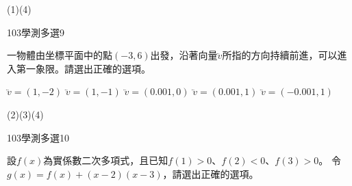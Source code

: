 \begin{QUESTIONS}
\begin{QUESTION}
        \begin{QANS}
            (1)(4)
        \end{QANS}
        \begin{QSOLLIST}
        \end{QSOLLIST}
        \begin{QEMPTYSPACE}
        \end{QEMPTYSPACE}
    \end{QUESTION}
    \begin{QUESTION}
        \begin{ExamInfo}{103}{學測}{多選}{9}
        \end{ExamInfo}
        \begin{ExamAnsRateInfo}{71}{94}{77}{42}
        \end{ExamAnsRateInfo}
        \begin{QBODY}
			一物體由坐標平面中的點$(-3,6)$出發，沿著向量$\lvec{v}$所指的方向持續前進，可以進入第一象限。請選出正確的選項。
			\begin{QOPS}
				\QOP $\lvec{v}=(1,-2)$
				\QOP $\lvec{v}=(1,-1)$
				\QOP $\lvec{v}=(0.001,0)$
				\QOP $\lvec{v}=(0.001,1)$
				\QOP $\lvec{v}=(-0.001,1)$
			\end{QOPS}
        \end{QBODY}
        \begin{QFROMS}
        \end{QFROMS}
        \begin{QTAGS}\end{QTAGS}
        \begin{QANS}
            (2)(3)(4)
        \end{QANS}
        \begin{QSOLLIST}
        \end{QSOLLIST}
        \begin{QEMPTYSPACE}
        \end{QEMPTYSPACE}
    \end{QUESTION}
    \begin{QUESTION}
        \begin{ExamInfo}{103}{學測}{多選}{10}
        \end{ExamInfo}
        \begin{ExamAnsRateInfo}{53}{83}{52}{24}
        \end{ExamAnsRateInfo}
        \begin{QBODY}
		設$f(x)$為實係數二次多項式，且已知$f(1)>0$、$f(2)<0$、$f(3)>0$。
		令$g(x)=f(x)+(x-2)(x-3)$，請選出正確的選項。
		\begin{QOPS}

\end{QOPS}
\end{QBODY}
\end{QUESTION}
\end{QUESTIONS}

